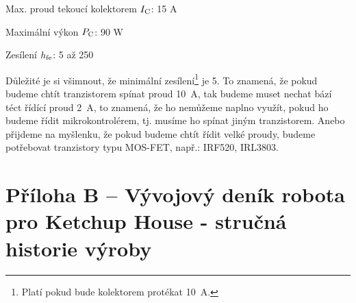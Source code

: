 Max. proud tekoucí kolektorem $I \rm _C$: 15 A

Maximální výkon $P \rm _C$: 90 W

Zesílení $h \rm _{fe}$: 5 až 250

Důležité je si všimnout, že minimální zesílení\footnote{Platí pokud bude kolektorem protékat 10~A.}  je 5. 
To znamená, že pokud budeme chtít tranzistorem spínat proud 10~A, tak budeme muset nechat bází téct řídící proud 2~A,
 to znamená, že ho nemůžeme naplno využít, pokud ho budeme řídit mikrokontrolérem, tj. musíme ho spínat jiným tranzistorem. 
 Anebo přijdeme na myšlenku, že pokud budeme chtít řídit velké proudy, budeme potřebovat tranzistory typu MOS-FET, např.: IRF520, IRL3803.





\section*{Příloha B -- Vývojový deník robota pro Ketchup House - stručná historie výroby }

